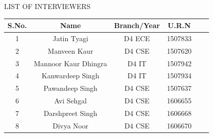 \documentclass[12pt, a4 paper]{article}
\begin{document}
\begin{center}
\huge LIST OF INTERVIEWERS
\end{center}

\begin{table}[h!]
  \begin{center}
    \begin{tabular}{|c|c|c|c|c|c|} 
    \toprule %
      \textbf{S.No.} & \textbf{Name} & \textbf{Branch/Year} & \textbf{U.R.N} \\
      \midrule %
      1	& Jatin Tyagi	       & D4 ECE	& 1507833 \\
      2	& Manveen Kaur	       & D4 CSE	& 1507620 \\
      3	& Mannoor Kaur Dhingra & D4 IT	& 1507942 \\
      4	& Kanwardeep Singh	   & D4 IT	& 1507934 \\
      5	& Pawandeep Singh	   & D4 CSE	& 1507637 \\
      6	& Avi Sehgal	       & D4 CSE	& 1606655 \\
      7	& Darshpreet Singh	   & D4 CSE	& 1606668 \\
      8	& Divya Noor 	       & D4 CSE	& 1606670 \\

      \bottomrule %
    \end{tabular}
  \end{center}
\end{table}

\newpage



\end{document}
